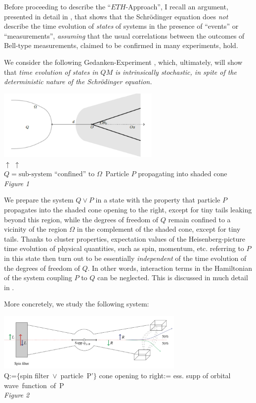 \documentclass[a4paper,11pt]{article}
\begin{document}
Before proceeding to describe the ``$ETH$-Approach'', I recall an argument, presented in detail in \cite{FFS}, that shows that the Schr\"{o}dinger equation does \textit{not} describe the time evolution of \textit{states} of systems in the presence of ``events'' or ``measurements'', \textit{assuming} that the usual correlations between the outcomes of Bell-type measurements, claimed to be confirmed in many experiments, hold.

We consider the following Gedanken-Experiment \cite{FFS}, which, ultimately, will show that {\textit{time evolution of states in $QM$ is intrinsically stochastic, in spite of the deterministic nature of the Schr\"{o}dinger equation.}}
\begin{center}
\includegraphics[width=7.9cm]{Clustering.png}\\
{\small{$\uparrow$}}\hspace{4cm} {\small{$\uparrow$}}\\
$Q= \text{sub-system ``confined'' to } \Omega$\, \hspace{0.3cm} Particle $P$ propagating into shaded cone\\
\textit{Figure 1}
\end{center}
We prepare the system $Q\vee P$ in a state with the property that particle $P$ propagates into the shaded cone opening to the right, except for tiny tails leaking beyond this region, while the degrees of freedom of $Q$ remain confined to a vicinity of the region $\Omega$ in the complement of the shaded cone, except for tiny tails. Thanks to cluster properties, expectation values of the Heisenberg-picture time evolution of physical quantities, such as spin, momentum, etc. referring to $P$ in this state then turn out to be essentially \textit{independent} of the time evolution of the degrees of freedom of $Q$. In other words, interaction terms in the Hamiltonian of 
the system coupling $P$ to $Q$ can be neglected. This is discussed in much detail in \cite{FFS}.

More concretely, we study the following system:
\begin{center}
\includegraphics[width=9.1cm]{Spin-Filter.png}\\
\small{
Q:=$\lbrace$spin filter\, $\vee$\, particle\, P'$\rbrace$ \hspace{0.45cm} cone opening to right:= ess. supp of orbital \mbox{wave function of P\,}\\
}
\vspace{0.1cm}
\textit{Figure 2}
\end{center}
\end{document}
